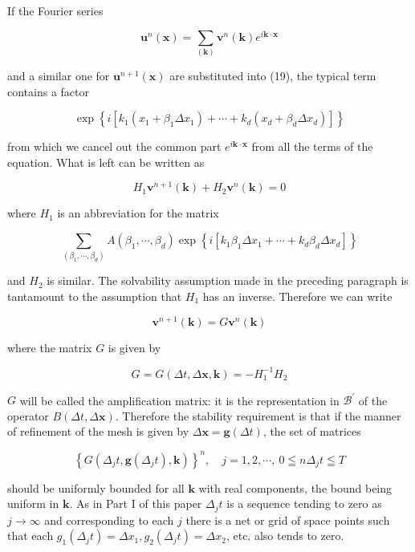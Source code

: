 \documentclass[10pt]{article}
\begin{document}
If the Fourier series

\[
\mathbf{u}^{n}(\mathbf{x})=\sum_{(\mathbf{k})} \mathbf{v}^{n}(\mathbf{k}) e^{i \mathbf{k} \cdot \mathbf{x}}
\]

and a similar one for \(\mathbf{u}^{n+1}(\mathbf{x})\) are substituted into (19), the typical term contains a factor

\[
\exp \left\{i\left[k_{1}\left(x_{1}+\beta_{1} \Delta x_{1}\right)+\cdots+k_{d}\left(x_{d}+\beta_{d} \Delta x_{d}\right)\right]\right\}
\]

from which we cancel out the common part \(e^{i \mathbf{k} \cdot \mathbf{x}}\) from all the terms of the equation. What is left can be written as

\[
H_{1} \mathbf{v}^{n+1}(\mathbf{k})+H_{2} \mathbf{v}^{n}(\mathbf{k})=0
\]

where \(H_{1}\) is an abbreviation for the matrix

\[
\sum_{\left(\beta_{1}, \cdots, \beta_{d}\right)} A\left(\beta_{1}, \cdots, \beta_{d}\right) \exp \left\{i\left[k_{1} \beta_{1} \Delta x_{1}+\cdots+k_{d} \beta_{d} \Delta x_{d}\right]\right\}
\]

and \(H_{2}\) is similar. The solvability assumption made in the preceding paragraph is tantamount to the assumption that \(H_{1}\) has an inverse. Therefore we can write

\[
\mathbf{v}^{n+1}(\mathbf{k})=G \mathbf{v}^{n}(\mathbf{k})
\]

where the matrix \(G\) is given by

\[
G=G(\Delta t, \Delta \mathbf{x}, \mathbf{k})=-H_{1}^{-1} H_{2}
\]

\(G\) will be called the amplification matrix: it is the representation in \(\mathscr{B}^{\prime}\) of the operator \(B(\Delta t, \Delta \mathbf{x})\). Therefore the stability requirement is that if the manner of refinement of the mesh is given by \(\Delta \mathbf{x}=\mathbf{g}(\Delta t)\), the set of matrices

\[
\left\{G\left(\Delta_{j} t, \mathbf{g}\left(\Delta_{j} t\right), \mathbf{k}\right)\right\}^{n}, \quad j=1,2, \cdots, ~ 0 \leqq n \Delta_{j} t \leqq T
\]

should be uniformly bounded for all \(\mathbf{k}\) with real components, the bound being uniform in \(\mathbf{k}\). As in Part I of this paper \(\Delta_{j} t\) is a sequence tending to zero as \(j \rightarrow \infty\) and corresponding to each \(j\) there is a net or grid of space points such that each \(g_{1}\left(\Delta_{j} t\right)=\Delta x_{1}, g_{2}\left(\Delta_{j} t\right)=\Delta x_{2}\), etc. also tends to zero.
\end{document}
